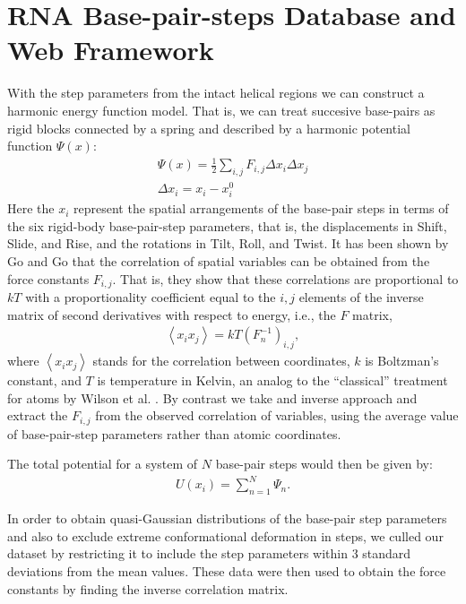 \section{RNA Base-pair-steps Database and Web Framework}
With the step parameters from the intact helical regions we can
construct  a harmonic  energy function  model. That  is, we  can treat
succesive  base-pairs  as  rigid  blocks  connected by  a  spring  and
described by a harmonic potential function $\Psi(x)$:
\begin{gather}
\Psi (x) = \frac{1}{2}\sum_{i,j} F_{i,j} \Delta x_{i} \Delta x_{j}\\
\Delta x_{i}=x_{i}-x_{i}^{0}
\end{gather} 
Here the  $x_{i}$ represent the spatial arrangements  of the base-pair
steps in  terms of the six rigid-body  base-pair-step parameters, that
is, the displacements in Shift,  Slide, and Rise, and the rotations in
Tilt, Roll,  and Twist. It has  been shown by Go  and Go \cite{go1976}
that the  correlation of  spatial variables can  be obtained  from the
force constants $F_{i,j}$. That  is, they show that these correlations
are proportional  to $kT$ with a proportionality  coefficient equal to
the $i,j$  elements of the  inverse matrix of second  derivatives with
respect to energy, i.e., the $F$ matrix,
\begin{gather}
\left<x_i x_j\right> = kT (F_{n}^{-1})_{i,j} ,
\end{gather} 
where  $\left< x_i  x_j \right>$  stands for  the  correlation between
coordinates,  $k$ is Boltzman's  constant, and  $T$ is  temperature in
Kelvin, an analog  to the ``classical'' treatment for  atoms by Wilson
et al.   \cite{wilson1955}. By contrast  we take and  inverse approach
and extract the $F_{i,j}$  from the observed correlation of variables,
using  the  average value  of  base-pair-step  parameters rather  than
atomic coordinates.

The total potential for a system  of $N$ base-pair steps would then be
given by:
\begin{gather}
U(x_{i}) = \sum_{n=1}^{N} \Psi_{n} .
\end{gather}

In order to obtain  quasi-Gaussian distributions of the base-pair step
parameters and  also to exclude extreme  conformational deformation in
steps, we  culled our  dataset by restricting  it to include  the step
parameters within  3 standard deviations  from the mean  values. These
data  were then  used to  obtain the  force constants  by  finding the
inverse correlation matrix.

